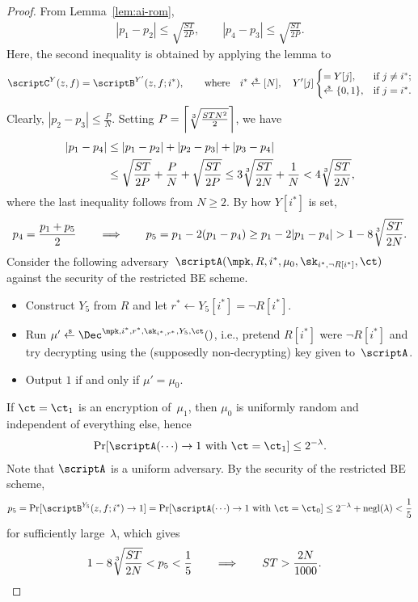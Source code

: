 \begin{proof}
From Lemma~\ref{lem:ai-rom},
\begin{align*}
|p_1-p_2|\leq\sqrt{\frac{ST}{2P}},\qquad
|p_4-p_3|\leq\sqrt{\frac{ST}{2P}}.
\end{align*}
Here, the second inequality is obtained by applying the lemma to
\begin{align*}
\scriptC^Y(z,f)=\scriptB^{Y'}(z,f;i^\ast),\qquad
\textup{where}\quad
i^\ast\draws[N],\quad
Y'[j]\begin{cases}
=Y[j],&\textup{if }j\neq i^\ast;\\
\draws\bit,&\textup{if }j=i^\ast.
\end{cases}
\end{align*}
Clearly, ${|p_2-p_3|\leq\frac{P}{N}}$.
Setting ${P=\left\lceil\sqrt[3]{\frac{STN^2}{2}}\right\rceil}$, we have
\begin{align*}
|p_1-p_4|
&{}\leq
|p_1-p_2|+|p_2-p_3|+|p_3-p_4|
\\&{}\leq
\sqrt{\frac{ST}{2P}}+\frac{P}{N}+\sqrt{\frac{ST}{2P}}
\leq
3\sqrt[3]{\frac{ST}{2N}}+\frac1N
<
4\sqrt[3]{\frac{ST}{2N}},
\end{align*}
where the last inequality follows from ${N\geq 2}$.
By how $Y[i^\ast]$ is set,
\begin{align*}
p_4=\frac{p_1+p_5}{2}
\qquad
\Longrightarrow
\qquad
p_5
=p_1-2(p_1-p_4)
\geq p_1-2|p_1-p_4|
>1-8\sqrt[3]{\frac{ST}{2N}}.
\end{align*}
Consider the following adversary~$\scriptA(\mpk,R,i^\ast,\mu_0,\sk_{i^\ast,\neg R[i^\ast]},\ct)$ against the security of the restricted BE scheme.
\begin{itemize}
\item Construct $Y_5$ from $R$ and
let ${r^\ast\gets Y_5[i^\ast]=\neg R[i^\ast]}$.
\item Run ${\mu'\draws\Dec^{\mpk,i^\ast,r^\ast,\sk_{i^\ast,r^\ast},Y_5,\ct}()}$,
i.e., pretend $R[i^\ast]$ were $\neg R[i^\ast]$ and try decrypting using the (supposedly non-decrypting) key given to~$\scriptA$.
\item Output $1$ if and only if ${\mu'=\mu_0}$.
\end{itemize}
If ${\ct=\ct_1}$ is an encryption of~$\mu_1$, then $\mu_0$ is uniformly random and independent of everything else, hence
\begin{align*}
\Pr[\scriptA({\cdots})\to 1\textup{ with }\ct=\ct_1]\leq 2^{-\lambda}.
\end{align*}
Note that $\scriptA$ is a uniform adversary.
By the security of the restricted BE scheme,
\begin{align*}
p_5
=\Pr[\scriptB^{Y_5}(z,f;i^\ast)\to 1]
=\Pr[\scriptA({\cdots})\to 1\textup{ with }\ct=\ct_0]
\leq 2^{-\lambda}+\negl(\lambda)
<\frac15
\end{align*}
for sufficiently large~$\lambda$, which gives
\begin{align*}
1-8\sqrt[3]{\frac{ST}{2N}}<p_5<\frac15
&
\qquad\Longrightarrow\qquad
ST>\frac{2N}{1000}.
\qedhere
\end{align*}
\end{proof}
